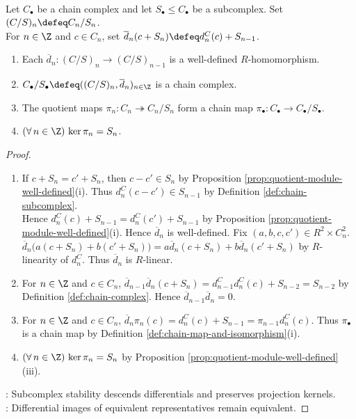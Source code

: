 \begin{proposition} \label{prop:quotient-chain-complex} \\
Let $C_\bullet$ be a chain complex and let $S_\bullet\leq C_\bullet$ be a subcomplex. Set $(C/S)_n\defeq C_n/S_n$.\\
For $n\in\Z$ and $c\in C_n$, set $\overline{d}_n(c+S_n)\defeq d^C_n(c)+S_{n-1}$.
\begin{enumerate}[label=(\roman*)]
\setlength{\itemsep}{0pt}
\item Each $\overline{d}_n:(C/S)_n\to(C/S)_{n-1}$ is a well-defined $R$-homomorphism.
\item $C_\bullet/S_\bullet\defeq((C/S)_n,\overline{d}_n)_{n\in\Z}$ is a chain complex.
\item The quotient maps $\pi_n:C_n\twoheadrightarrow C_n/S_n$ form a chain map $\pi_\bullet:C_\bullet\to C_\bullet/S_\bullet$.
\item $(\forall\,n\in\Z)\,\ker\pi_n=S_n$.
\end{enumerate}
\begin{proof}
\begin{enumerate}[label=(\roman*)]
\setlength{\itemsep}{0pt}
\item If $c+S_n=c'+S_n$, then $c-c'\in S_n$ by Proposition \ref{prop:quotient-module-well-defined}(i). Thus $d^C_n(c-c')\in S_{n-1}$ by Definition \ref{def:chain-subcomplex}.\\
Hence $d^C_n(c)+S_{n-1}=d^C_n(c')+S_{n-1}$ by Proposition \ref{prop:quotient-module-well-defined}(i). Hence $\overline{d}_n$ is well-defined. Fix $(a,b,c,c')\in R^2\times C_n^2$.\\
$\overline{d}_n\bigl(a(c+S_n)+b(c'+S_n)\bigr)=a\overline{d}_n(c+S_n)+b\overline{d}_n(c'+S_n)$ by $R$-linearity of $d^C_n$. Thus $\overline{d}_n$ is $R$-linear.
\item For $n\in\Z$ and $c\in C_n$, $\overline{d}_{n-1}\overline{d}_n(c+S_n)=d^C_{n-1}d^C_n(c)+S_{n-2}=S_{n-2}$ by Definition \ref{def:chain-complex}. Hence $\overline{d}_{n-1}\overline{d}_n=0$.
\item For $n\in\Z$ and $c\in C_n$, $\overline{d}_n\pi_n(c)=d^C_n(c)+S_{n-1}=\pi_{n-1}d^C_n(c)$. Thus $\pi_\bullet$ is a chain map by Definition \ref{def:chain-map-and-isomorphism}(i).
\item $(\forall\,n\in\Z)\,\ker\pi_n=S_n$ by Proposition \ref{prop:quotient-module-well-defined}(iii).
\end{enumerate}
: Subcomplex stability descends differentials and preserves projection kernels.\\
: Differential images of equivalent representatives remain equivalent.
\end{proof}
\end{proposition}

